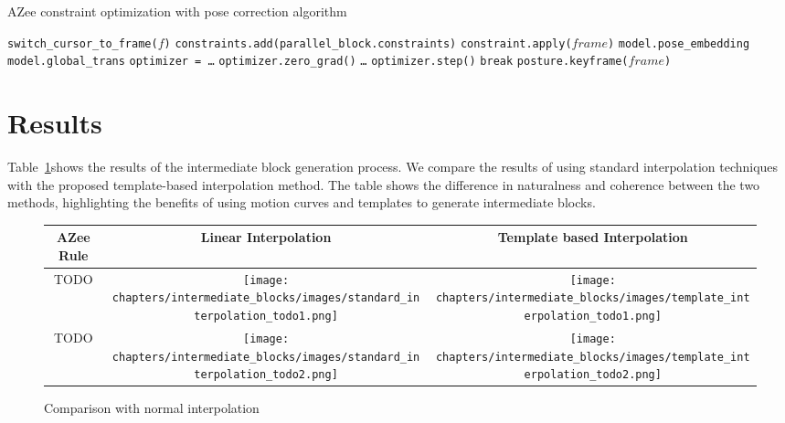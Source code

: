 \documentclass[../../main.tex]{subfiles}
\begin{document}
\begin{algorithm}
  \caption{AZee constraint optimization with pose correction algorithm}
  \label{alg:pose_correction}
  \begin{algorithmic}[1]
      \State \texttt{switch\_cursor\_to\_frame($f$)}
          \State \texttt{constraints.add(parallel\_block.constraints)}
      \EndFor
          \State \texttt{constraint.apply($frame$)}
      \EndFor
      \State \texttt{model.pose\_embedding}
      \State \texttt{model.global\_trans}
      \State \texttt{optimizer = \dots}
          \State \texttt{optimizer.zero\_grad()}
          \State \texttt{\dots}
          \State \texttt{optimizer.step()}
           \State \texttt{break} \EndIf
      \EndFor
      \State \texttt{posture.keyframe($frame$)}
  \EndFor
  \end{algorithmic}
  \end{algorithm}

\section{Results}
\label{ch:intermediate_blocks_pose_correction:results}

Table~\ref{tab:intermediate_blocks_comparison}shows the results of the intermediate block generation process. We compare the results of using standard interpolation techniques with the proposed template-based interpolation method. The table shows the difference in naturalness and coherence between the two methods, highlighting the benefits of using motion curves and templates to generate intermediate blocks.
\begin{figure}
    \centering
    \begin{tabular}{|c|c|c|}
    \hline
    \textbf{AZee Rule} & \textbf{Linear Interpolation} & \textbf{Template based Interpolation} \\
    \hline
    TODO & \texttt{[image: chapters/intermediate\_blocks/images/standard\_interpolation\_todo1.png]} & \texttt{[image: chapters/intermediate\_blocks/images/template\_interpolation\_todo1.png]} \\
    \hline
    TODO & \texttt{[image: chapters/intermediate\_blocks/images/standard\_interpolation\_todo2.png]} & \texttt{[image: chapters/intermediate\_blocks/images/template\_interpolation\_todo2.png]} \\
    \hline
    \end{tabular}
    \caption{Comparison with normal interpolation}
    \label{tab:intermediate_blocks_comparison}
\end{figure}
\end{document}
